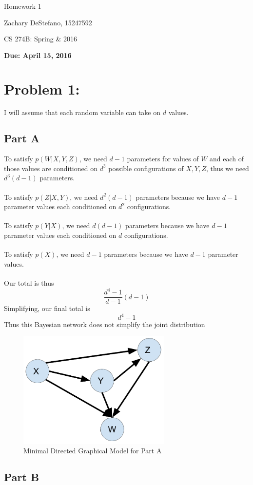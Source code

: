 \documentclass[twoside,11pt]{article}
\theoremstyle{definition}
\begin{document}
\centerline{\Large Homework 1}
\centerline{Zachary DeStefano, 15247592}
\centerline{CS 274B: Spring \& 2016}
\centerline{\bf Due: April 15, 2016}

\section*{Problem 1: }

I will assume that each random variable can take on $d$ values.

\subsection*{Part A}

To satisfy $p(W|X,Y,Z)$, we need $d-1$ parameters for values of $W$ and each of those values are conditioned on $d^3$ possible configurations of $X,Y,Z$, thus we need $d^3(d-1)$ parameters.\\
\\
To satisfy $p(Z|X,Y)$, we need $d^2(d-1)$ parameters because we have $d-1$ parameter values each conditioned on $d^2$ configurations. \\
\\
To satisfy $p(Y|X)$, we need $d(d-1)$ parameters because we have $d-1$ parameter values each conditioned on $d$ configurations.\\
\\
To satisfy $p(X)$, we need $d-1$ parameters because we have $d-1$ parameter values.\\
\\
Our total is thus
\[
\frac{d^4-1}{d-1}(d-1)
\]
Simplifying, our final total is
\[
d^4-1
\]
Thus this Bayesian network does not simplify the joint distribution
\begin{figure}[h]
\centering
\includegraphics[width=3in]{HW1_Prob1_partA.png}
\caption{Minimal Directed Graphical Model for Part A}
\end{figure}
\newpage
\subsection*{Part B}
\end{document}
